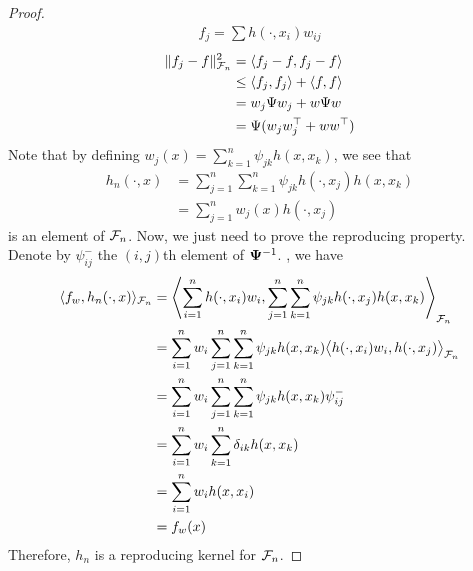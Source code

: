 \begin{proof}
  \begin{align*}
    f_j = \sum h(\cdot,x_i)w_{ij}
  \end{align*}
  \begin{align*}
    \lVert f_j-f\rVert_{{\mathcal F}_n}^2 &= \langle f_j-f,f_j-f\rangle \\
    &\leq \langle f_j,f_j\rangle + \langle f,f\rangle \\
    &= w_j\Psi w_j + w\Psi w \\
    &= \Psi(w_jw_j^\top + ww^\top)
  \end{align*}
  Note that by defining $w_j(x) = \sum_{k=1}^n \psi_{jk} h(x,x_k)$, we see that
  \begin{align*}
    h_n(\cdot,x) 
    &= \sum_{j=1}^n\sum_{k=1}^n \psi_{jk} h(\cdot,x_j) h(x,x_k) \\
    &= \sum_{j=1}^n w_j(x)h(\cdot,x_j)
  \end{align*}
  is an element of ${\mathcal F}_n$.
  Now, we just need to prove the reproducing property. 
  Denote by $\psi_{ij}^{-}$ the $(i,j)$th element of ${\bm\Psi}^{-1}$.
  , we have
  \begin{align*}
    \langle f_w, h_n(\cdot,x)\rangle_{{\mathcal F}_n}
    &= \left\langle 
    \sum_{i=1}^n h(\cdot,x_i)w_i ,
    \sum_{j=1}^n\sum_{k=1}^n \psi_{jk} h(\cdot,x_j) h(x,x_k)
    \right\rangle_{{\mathcal F}_n} \\
    &= \sum_{i=1}^n w_i \sum_{j=1}^n\sum_{k=1}^n \psi_{jk}h(x,x_k) 
    \big\langle h(\cdot,x_i)w_i , h(\cdot,x_j) \big\rangle_{{\mathcal F}_n} \\
    &= \sum_{i=1}^n w_i \sum_{j=1}^n\sum_{k=1}^n \psi_{jk}h(x,x_k)\psi_{ij}^{-} \\
    &= \sum_{i=1}^n w_i \sum_{k=1}^n \delta_{ik}h(x,x_k) \\
    &= \sum_{i=1}^n w_i h(x,x_i) \\
    &= f_w(x)
  \end{align*}
  Therefore, $h_n$ is a reproducing kernel for ${\mathcal F}_n$.
\end{proof}


